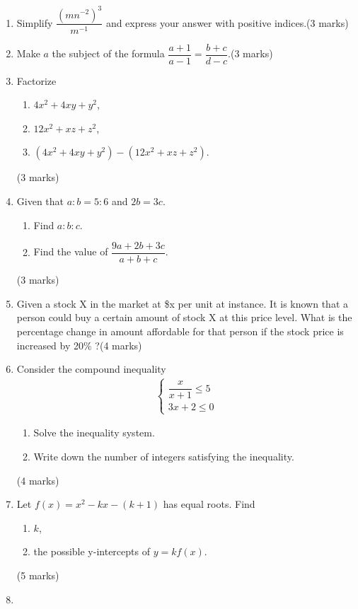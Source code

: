\documentclass[12pt]{article}
\begin{document}
    \begin{enumerate}
        \item Simplify $\dfrac{(mn^{-2})^3}{m^{-1}}$ and express your answer with positive indices.\hfill (3 marks)
        \item Make $a$ the subject of the formula $\dfrac{a+1}{a-1}=\dfrac{b+c}{d-c}$.\hfill (3 marks)
        \item Factorize \begin{enumerate}
            \item $4x^2+4xy+y^2$,
            \item $12x^2+xz+z^2$,
            \item $(4x^2+4xy+y^2)-(12x^2+xz+z^2)$.
        \end{enumerate}\hfill (3 marks)
        \item Given that $a:b=5:6$ and $2b=3c$.\begin{enumerate}
            \item Find $a:b:c$.
            \item Find the value of $\dfrac{9a+2b+3c}{a+b+c}$.
        \end{enumerate}\hfill (3 marks)
        \item Given a stock X in the market at \$x per unit at instance. It is known that a person could buy a certain amount of stock X at this price level. What is the percentage change in amount affordable for that person if the stock price is increased by 20\% ?\hfill (4 marks)
        \item Consider the compound inequality \begin{align*}
            \begin{cases}
                \dfrac{x}{x+1}\leq 5\\
                3x+2\leq 0
            \end{cases}
        \end{align*}
        \begin{enumerate}
            \item Solve the inequality system.
            \item Write down the number of integers satisfying the inequality.
        \end{enumerate}\hfill (4 marks)
        \item Let $f(x)=x^2-kx-(k+1)$ has equal roots. Find \begin{enumerate}
            \item $k$,
            \item the possible y-intercepts of $y=kf(x)$.
        \end{enumerate}\hfill (5 marks)
        \item 
    \end{enumerate}
\end{document}
